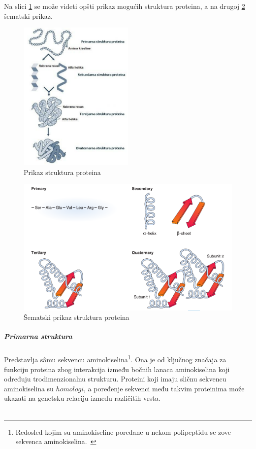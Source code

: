Na slici \ref{fig:structures} se može videti opšti prikaz mogućih struktura proteina, a na drugoj \ref{fig:structures2} šematski prikaz.
\begin{figure}[h]
	\centering
    \includegraphics[width=0.5\textwidth]{Figures/BO/protein_structures.png}
    \caption{Prikaz struktura proteina}
    \label{fig:structures}
\end{figure}
\begin{figure}[h]
	\centering
    \includegraphics[width=1\textwidth]{Figures/BO/structure_schema.png}
    \caption{Šematski prikaz struktura proteina~\cite{bmbg}}
    \label{fig:structures2}
\end{figure}
\subparagraph{Primarna struktura}
Predstavlja s\^amu sekvencu aminokiselina\footnote{Redosled kojim su aminokiseline poređane u nekom polipeptidu se zove sekvenca aminokiselina.~\cite{spasic}}. Ona je od ključnog značaja za funkciju proteina zbog interakcija između bočnih lanaca aminokiselina koji određuju trodimenzionalnu strukturu. Proteini koji imaju sličnu sekvencu aminokiselina su $homologi$, a poređenje sekvenci među takvim proteinima može ukazati na genetsku relaciju između različitih vrsta.\\\\
